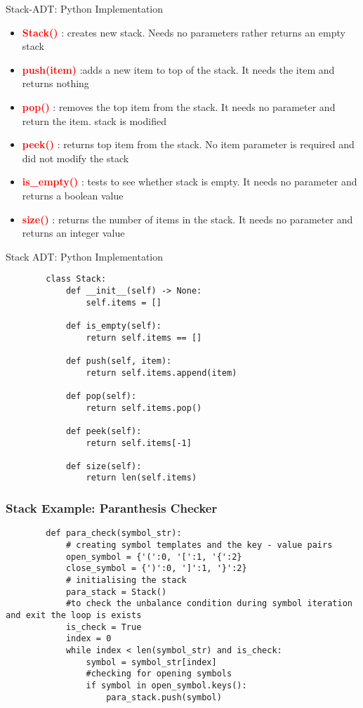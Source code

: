 \documentclass{beamer}
\begin{document}
\begin{frame}{Stack-ADT: Python Implementation}
    \begin{itemize}
        \item \textcolor{red}{\textbf{Stack()}} : creates new stack. Needs no parameters rather returns an empty stack
        \item  \textcolor{red}{\textbf{push(item)}} :adds a new item to top of the stack. It needs the item and returns nothing
        \item \textcolor{red}{\textbf{pop()}} : removes the top item from the stack. It needs no parameter and return the item. stack is modified
        \item \textcolor{red}{\textbf{peek()}} : returns top item from the stack. No item parameter is required and did not modify the stack
        \item \textcolor{red}{\textbf{is\_empty()}} : tests to see whether stack is empty. It needs no parameter and returns a boolean value
        \item \textcolor{red}{\textbf{size()}} :  returns the number of items in the stack. It needs no parameter and returns an integer value
    \end{itemize}
\end{frame}
\begin{frame}[fragile]{Stack ADT: Python Implementation}
    \begin{lstlisting}
        class Stack:
            def __init__(self) -> None:
                self.items = []

            def is_empty(self):
                return self.items == []

            def push(self, item):
                return self.items.append(item)

            def pop(self):
                return self.items.pop()

            def peek(self):
                return self.items[-1]

            def size(self):
                return len(self.items)
    \end{lstlisting}
\end{frame}
\begin{frame}[fragile]
    \frametitle{Stack Example: Paranthesis Checker}
    \begin{lstlisting}
        def para_check(symbol_str):
            # creating symbol templates and the key - value pairs
            open_symbol = {'(':0, '[':1, '{':2}
            close_symbol = {')':0, ']':1, '}':2}
            # initialising the stack
            para_stack = Stack()
            #to check the unbalance condition during symbol iteration and exit the loop is exists 
            is_check = True
            index = 0
            while index < len(symbol_str) and is_check:
                symbol = symbol_str[index]
                #checking for opening symbols
                if symbol in open_symbol.keys():
                    para_stack.push(symbol)
    \end{lstlisting}
\end{frame}
\end{document}
